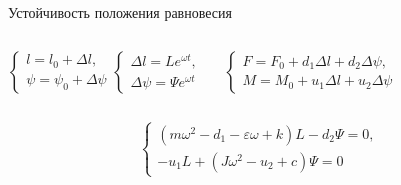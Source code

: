 \documentclass[ignoreonframetext,unicode]{beamer}
\begin{document}
\begin{frame}{Устойчивость положения равновесия}
	\vspace*{-2mm}
	\begin{columns}
		
	\begin{block}{}
		\vspace*{0mm}
		\begin{equation*}
			\begin{cases}
				l = l_0 + \Delta{l}, \\
				\psi = \psi_0 + \Delta{\psi}
			\end{cases}
			\begin{cases}
			\Delta{l} = L e^{\omega t}, \\
			\Delta{\psi} = \Psi e^{\omega t}
			\end{cases}
			\label{kjdkjsnadkjadsbafabjb}
		\end{equation*}
	\end{block}

	\begin{block}{}
		\vspace*{0mm}
		\begin{equation*}
			\begin{cases}
			F = F_0 + d_1 \Delta{l} + d_2 \Delta{\psi}, \\
			M = M_0 + u_1 \Delta{l} + u_2 \Delta{\psi}
			\end{cases}
			\label{kjdkjsasdsanadkjadsbafabjb}
		\end{equation*}
	\end{block}
	
	\end{columns}

\begin{block}{}
	\vspace*{-2mm}
	\begin{equation*}
		\begin{cases}
			\left( m \omega^2 - d_1 - \varepsilon \omega + k \right) L - d_2 \Psi = 0, \\
			- u_1 L + \left(J \omega^2 - u_2 + c \right) \Psi 	 = 0
		\end{cases}
		\label{kjdkjsnadkjddadsbafabjb}
	\end{equation*}
\end{block}



\end{frame}
\end{document}
